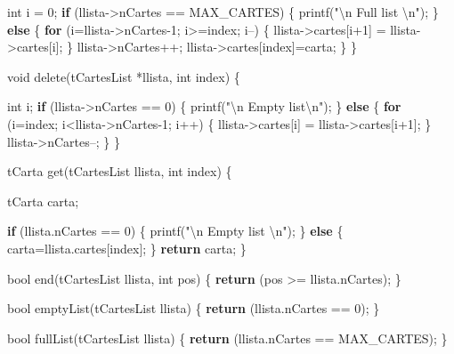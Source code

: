 \documentclass[]{book}
\newenvironment{Shaded}{\begin{snugshade}}{\end{snugshade}}
\newcommand{\DataTypeTok}[1]{\textcolor[rgb]{0.13,0.29,0.53}{#1}}
\newcommand{\DecValTok}[1]{\textcolor[rgb]{0.00,0.00,0.81}{#1}}
\newcommand{\SpecialCharTok}[1]{\textcolor[rgb]{0.00,0.00,0.00}{#1}}
\newcommand{\StringTok}[1]{\textcolor[rgb]{0.31,0.60,0.02}{#1}}
\newcommand{\ControlFlowTok}[1]{\textcolor[rgb]{0.13,0.29,0.53}{\textbf{#1}}}
\newcommand{\NormalTok}[1]{#1}
\begin{document}
\begin{Shaded}
\begin{Highlighting}[]
    \DataTypeTok{int}\NormalTok{ i = }\DecValTok{0}\NormalTok{;}
    \ControlFlowTok{if}\NormalTok{ (llista->nCartes == MAX_CARTES) \{}
\NormalTok{        printf(}\StringTok{"}\SpecialCharTok{\textbackslash{}n}\StringTok{ Full list }\SpecialCharTok{\textbackslash{}n}\StringTok{"}\NormalTok{);}
\NormalTok{    \} }\ControlFlowTok{else}\NormalTok{ \{}
        \ControlFlowTok{for}\NormalTok{ (i=llista->nCartes-}\DecValTok{1}\NormalTok{; i>=index; i--) \{}
\NormalTok{            llista->cartes[i+}\DecValTok{1}\NormalTok{] = llista->cartes[i];}
\NormalTok{        \}}
\NormalTok{        llista->nCartes++;}
\NormalTok{        llista->cartes[index]=carta;}
\NormalTok{    \}}
\NormalTok{\}}

\DataTypeTok{void}\NormalTok{ delete(tCartesList *llista, }\DataTypeTok{int}\NormalTok{ index) \{}

    \DataTypeTok{int}\NormalTok{ i;}
    \ControlFlowTok{if}\NormalTok{ (llista->nCartes == }\DecValTok{0}\NormalTok{) \{}
\NormalTok{        printf(}\StringTok{"}\SpecialCharTok{\textbackslash{}n}\StringTok{ Empty list}\SpecialCharTok{\textbackslash{}n}\StringTok{"}\NormalTok{);}
\NormalTok{    \} }\ControlFlowTok{else}\NormalTok{ \{}
        \ControlFlowTok{for}\NormalTok{ (i=index; i<llista->nCartes-}\DecValTok{1}\NormalTok{; i++) \{}
\NormalTok{            llista->cartes[i] = llista->cartes[i+}\DecValTok{1}\NormalTok{];}
\NormalTok{        \}}
\NormalTok{        llista->nCartes--;}
\NormalTok{    \}}
\NormalTok{\}}

\NormalTok{tCarta get(tCartesList llista, }\DataTypeTok{int}\NormalTok{ index) \{}

\NormalTok{    tCarta carta;}

    \ControlFlowTok{if}\NormalTok{ (llista.nCartes == }\DecValTok{0}\NormalTok{) \{}
\NormalTok{        printf(}\StringTok{"}\SpecialCharTok{\textbackslash{}n}\StringTok{ Empty list }\SpecialCharTok{\textbackslash{}n}\StringTok{"}\NormalTok{);}
\NormalTok{    \} }\ControlFlowTok{else}\NormalTok{ \{}
\NormalTok{        carta=llista.cartes[index];}
\NormalTok{    \}}
    \ControlFlowTok{return}\NormalTok{ carta;}
\NormalTok{\}}

\NormalTok{bool end(tCartesList llista, }\DataTypeTok{int}\NormalTok{ pos) \{}
    \ControlFlowTok{return}\NormalTok{ (pos >= llista.nCartes);}
\NormalTok{\}}

\NormalTok{bool emptyList(tCartesList llista) \{}
    \ControlFlowTok{return}\NormalTok{ (llista.nCartes == }\DecValTok{0}\NormalTok{);}
\NormalTok{\}}

\NormalTok{bool fullList(tCartesList llista) \{}
    \ControlFlowTok{return}\NormalTok{ (llista.nCartes == MAX_CARTES);}
\NormalTok{\}}


\end{Highlighting}
\end{Shaded}
\end{document}
